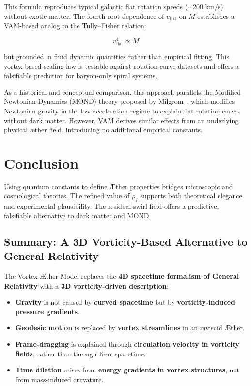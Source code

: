 \documentclass[preprint]{revtex4-2}
\begin{document}
        This formula reproduces typical galactic flat rotation speeds ($\sim$200 km/s) without exotic matter. The fourth-root dependence of $v_{\text{flat}}$ on $M$ establishes a VAM-based analog to the Tully--Fisher relation:

        \[
            v_{\text{flat}}^4 \propto M
        \]

        but grounded in fluid dynamic quantities rather than empirical fitting. This vortex-based scaling law is testable against rotation curve datasets and offers a falsifiable prediction for baryon-only spiral systems.

        As a historical and conceptual comparison, this approach parallels the Modified Newtonian Dynamics (MOND) theory proposed by Milgrom~\cite{milgrom1983mond1, milgrom1983mond2}, which modifies Newtonian gravity in the low-acceleration regime to explain flat rotation curves without dark matter. However, VAM derives similar effects from an underlying physical æther field, introducing no additional empirical constants.

        \section*{Conclusion}

        Using quantum constants to define \AE{}ther properties bridges microscopic and cosmological theories. The refined value of $\rho_{\scriptscriptstyle\boldsymbol\!f}$ supports both theoretical elegance and experimental plausibility. The residual swirl field offers a predictive, falsifiable alternative to dark matter and MOND.




        \subsection*{Summary: A 3D Vorticity-Based Alternative to General Relativity}

    The Vortex Æther Model replaces the \textbf{4D spacetime formalism of General Relativity} with a \textbf{3D vorticity-driven description}:

    \begin{itemize}
        \item \textbf{Gravity} is not caused by \textbf{curved spacetime} but by \textbf{vorticity-induced pressure gradients}.
        \item \textbf{Geodesic motion} is replaced by \textbf{vortex streamlines} in an inviscid Æther.
        \item \textbf{Frame-dragging} is explained through \textbf{circulation velocity in vorticity fields}, rather than through Kerr spacetime.
        \item \textbf{Time dilation} arises from \textbf{energy gradients in vortex structures}, not from mass-induced curvature.
    \end{itemize}
\end{document}
